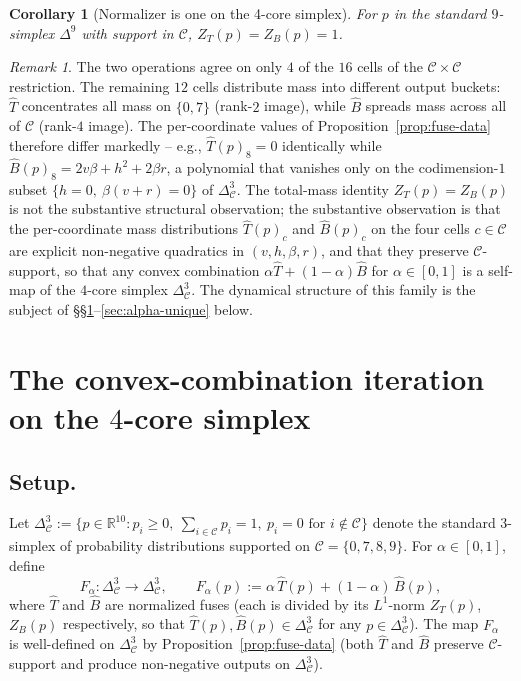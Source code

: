 \documentclass[11pt,reqno]{amsart}
\theoremstyle{plain}
\newtheorem{corollary}[theorem]{Corollary}
\theoremstyle{definition}
\theoremstyle{remark}
\newtheorem*{remark}{Remark}
\newcommand{\R}{\mathbb{R}}
\newcommand{\Cfour}{\mathcal{C}}
\newcommand{\Tfuse}{\widehat{T}}
\newcommand{\Bfuse}{\widehat{B}}
\begin{document}
\begin{corollary}[Normalizer is one on the 4-core simplex]\label{cor:Z=1}
For $p$ in the standard $9$-simplex $\Delta^{9}$ with support in
$\Cfour$, $Z_{T}(p)=Z_{B}(p)=1$.
\end{corollary}

\begin{remark}\label{rem:rank-disparity-detailed}
The two operations agree on only $4$ of the $16$ cells of the
$\Cfour\times\Cfour$ restriction. The remaining $12$ cells
distribute mass into different output buckets:
$\Tfuse$ concentrates all mass on $\{0, 7\}$ (rank-$2$ image),
while $\Bfuse$ spreads mass across all of $\Cfour$
(rank-$4$ image). The per-coordinate values of
Proposition~\ref{prop:fuse-data} therefore differ markedly --
e.g., $\Tfuse(p)_{8} = 0$ identically while $\Bfuse(p)_{8} =
2v\beta + h^{2} + 2\beta r$, a polynomial that vanishes only on
the codimension-$1$ subset $\{h = 0,\ \beta(v + r) = 0\}$ of
$\Delta^{3}_{\Cfour}$. The total-mass identity
$Z_{T}(p) = Z_{B}(p)$ is not the substantive structural
observation; the substantive observation is that the
per-coordinate mass distributions $\Tfuse(p)_{c}$ and
$\Bfuse(p)_{c}$ on the four cells $c\in\Cfour$ are explicit
non-negative quadratics in $(v, h, \beta, r)$, and that they
preserve $\Cfour$-support, so that any convex combination
$\alpha\Tfuse + (1-\alpha)\Bfuse$ for $\alpha\in[0,1]$ is a
self-map of the $4$-core simplex $\Delta^{3}_{\Cfour}$. The
dynamical structure of this family is the subject of
\S\S\ref{sec:dynamics}--\ref{sec:alpha-unique} below.
\end{remark}

\section{The convex-combination iteration on the $4$-core simplex}\label{sec:dynamics}

\subsection{Setup.} Let $\Delta^{3}_{\Cfour} := \{p\in\R^{10} :
p_{i}\ge 0,\ \sum_{i\in\Cfour}p_{i} = 1,\ p_{i} = 0\text{ for }
i\notin\Cfour\}$ denote the standard $3$-simplex of probability
distributions supported on $\Cfour = \{0, 7, 8, 9\}$. For
$\alpha\in[0,1]$, define
\[
  F_{\alpha}: \Delta^{3}_{\Cfour}\to \Delta^{3}_{\Cfour},
  \qquad
  F_{\alpha}(p) := \alpha\,\Tfuse(p) + (1-\alpha)\,\Bfuse(p),
\]
where $\Tfuse$ and $\Bfuse$ are normalized fuses (each is divided
by its $L^{1}$-norm $Z_{T}(p)$, $Z_{B}(p)$ respectively, so that
$\Tfuse(p), \Bfuse(p)\in\Delta^{3}_{\Cfour}$ for any
$p\in\Delta^{3}_{\Cfour}$). The map $F_{\alpha}$ is well-defined
on $\Delta^{3}_{\Cfour}$ by Proposition~\ref{prop:fuse-data} (both
$\Tfuse$ and $\Bfuse$ preserve $\Cfour$-support and produce
non-negative outputs on $\Delta^{3}_{\Cfour}$).
\end{document}
